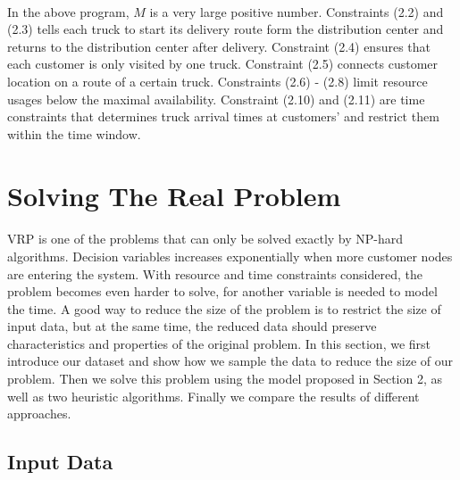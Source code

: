 \documentclass[12pt]{article}
\numberwithin{equation}{section}
\begin{document}
	\paragraph{}In the above program, $M$ is a very large positive number. Constraints (2.2) and (2.3) tells each truck to start its delivery route form the distribution center and returns to the distribution center after delivery. Constraint (2.4) ensures that each customer is only visited by one truck. Constraint (2.5) connects customer location on a route of a certain truck. Constraints (2.6) - (2.8) limit resource usages below the maximal availability. Constraint (2.10) and (2.11) are time constraints that determines truck arrival times at customers' and restrict them within the time window.


\section{Solving The Real Problem}
	
	\paragraph{}VRP is one of the problems that can only be solved exactly by NP-hard algorithms. Decision variables increases exponentially when more customer nodes are entering the system. With resource and time constraints considered, the problem becomes even harder to solve, for another variable is needed to model the time. A good way to reduce the size of the problem is to restrict the size of input data, but at the same time, the reduced data should preserve characteristics and properties of the original problem. In this section, we first introduce our dataset and show how we sample the data to reduce the size of our problem. Then we solve this problem using the model proposed in Section 2, as well as two heuristic algorithms. Finally we compare the results of different approaches.
	
	\subsection{Input Data}
	
\end{document}

